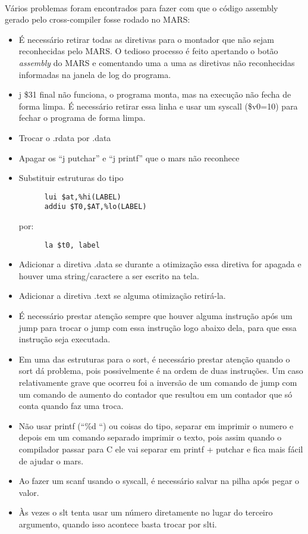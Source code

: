 \paragraph{}Vários problemas foram encontrados para fazer com que o código assembly gerado
pelo cross-compiler fosse rodado no MARS:
\begin{itemize}
        \item  É necessário retirar todas as diretivas para o montador que não
        sejam reconhecidas pelo MARS. O tedioso processo é feito apertando o botão
        \emph{assembly} do MARS e comentando uma a uma as diretivas não reconhecidas informadas na janela de log do programa.
        \item j \$31 final não funciona, o programa monta, mas na execução não fecha de forma limpa. É necessário retirar essa linha e usar um syscall (\$v0=10) para fechar o programa de forma limpa.
        \item Trocar o .rdata por .data
        \item Apagar os “j putchar” e “j printf” que o mars não reconhece
        \item Substituir estruturas do tipo
                \begin{verbatim}
      lui $at,%hi(LABEL)
      addiu $T0,$AT,%lo(LABEL)
                \end{verbatim}
               por:
               \begin{verbatim}
      la $t0, label
               \end{verbatim}
        \item Adicionar a diretiva .data se durante a otimização essa diretiva for apagada e houver uma string/caractere a ser escrito na tela.
        \item  Adicionar a diretiva .text se alguma otimização retirá-la.
        \item  É necessário prestar atenção sempre que houver alguma instrução após um jump para trocar o jump com essa instrução logo abaixo dela, para que essa instrução seja executada.
        \item Em uma das estruturas para o sort, é necessário prestar atenção quando o sort dá problema, pois possivelmente é na ordem de duas instruções. Um caso relativamente grave que ocorreu foi a inversão de um comando de jump com um comando de aumento do contador que resultou em um contador que só conta quando faz uma troca.
        \item  Não usar printf (“\%d “) ou coisas do tipo, separar em imprimir o numero e depois em um comando separado imprimir o texto, pois assim quando o compilador passar para C ele vai separar em printf + putchar e fica mais fácil de ajudar o mars.
        \item  Ao fazer um scanf usando o syscall, é necessário salvar na pilha após pegar o valor. 
        \item  Às vezes o slt tenta usar um número diretamente no lugar do terceiro argumento, quando isso acontece basta trocar por slti.
\end{itemize}

